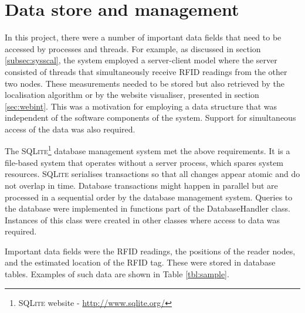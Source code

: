 \section{Data store and management}
\label{sec:dataman}

In this project, there were a number of important data fields that need to be accessed by processes and threads. For example, as discussed in section \ref{subsec:sysscal}, the system employed a server-client model where the server consisted of threads that simultaneously receive RFID readings from the other two nodes. These measurements needed to be stored but also retrieved by the localisation algorithm or by the website visualiser, presented in section \ref{sec:webint}. This was a motivation for employing a data structure that was independent of the software components of the system. Support for simultaneous access of the data was also required.

The \textsc{SQLite}\footnote{\textsc{SQLite} website - \url{http://www.sqlite.org/}} database management system met the above requirements. It is a file-based system that operates without a server process, which spares system resources. \textsc{SQLite} serialises transactions so that all changes appear atomic and do not overlap in time. Database transactions might happen in parallel but are processed in a sequential order by the database management system. Queries to the database were implemented in functions part of the \textsf{DatabaseHandler} class. Instances of this class were created in other classes where access to data was required.

Important data fields were the RFID readings, the positions of the reader nodes, and the estimated location of the RFID tag. These were stored in database tables. Examples of such data are shown in Table \ref{tbl:sample}.

